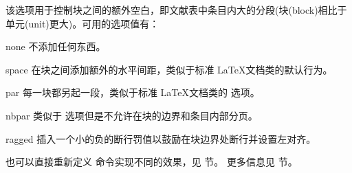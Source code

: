 \begin{optionlist}
该选项用于控制块之间的额外空白，即文献表中条目内大的分段(块(block)相比于单元(unit)更大)。可用的选项值有：

\begin{valuelist}

\item[none] %
不添加任何东西。

\item[space] %
在块之间添加额外的水平间距，类似于标准 \LaTeX 文档类的默认行为。

\item[par] %
每一块都另起一段，类似于标准 \LaTeX 文档类的  选项。

\item[nbpar] %
类似于  选项但是不允许在块的边界和条目内部分页。

\item[ragged] %
插入一个小的负的断行罚值以鼓励在块边界处断行并设置左对齐。

\end{valuelist}


也可以直接重新定义  命令实现不同的效果，见   节。
更多信息见  节。




\end{optionlist}
